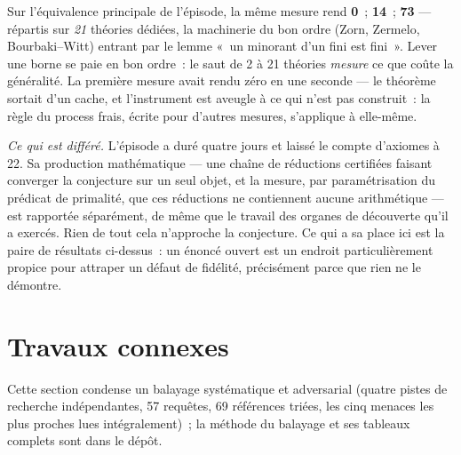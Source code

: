 \documentclass[11pt]{article}
\theoremstyle{remark}\newtheorem{example}{Exemple}
\begin{document}
Sur l'équivalence principale de l'épisode, la même mesure rend \textbf{0}~;
\textbf{14}~; \textbf{73} --- répartis sur \emph{21} théories dédiées, la machinerie du
bon ordre (Zorn, Zermelo, Bourbaki--Witt) entrant par le lemme «~un minorant d'un fini
est fini~». Lever une borne se paie en bon ordre~: le saut de 2 à 21 théories
\emph{mesure} ce que coûte la généralité. La première mesure avait rendu zéro en une
seconde --- le théorème sortait d'un cache, et l'instrument est aveugle à ce qui n'est
pas construit~: la règle du process frais, écrite pour d'autres mesures, s'applique à
elle-même.

\emph{Ce qui est différé.} L'épisode a duré quatre jours et laissé le compte d'axiomes à
22. Sa production mathématique --- une chaîne de réductions certifiées faisant converger
la conjecture sur un seul objet, et la mesure, par paramétrisation du prédicat de
primalité, que ces réductions ne contiennent aucune arithmétique --- est rapportée
séparément, de même que le travail des organes de découverte qu'il a exercés. Rien de
tout cela n'approche la conjecture. Ce qui a sa place ici est la paire de résultats
ci-dessus~: un énoncé ouvert est un endroit particulièrement propice pour attraper un
défaut de fidélité, précisément parce que rien ne le démontre.

\section{Travaux connexes}
\label{sec:related}
Cette section condense un balayage systématique et adversarial (quatre pistes de
recherche indépendantes, 57 requêtes, 69 références triées, les cinq menaces les plus
proches lues intégralement)~; la méthode du balayage et ses tableaux complets sont dans
le dépôt.
\end{document}
